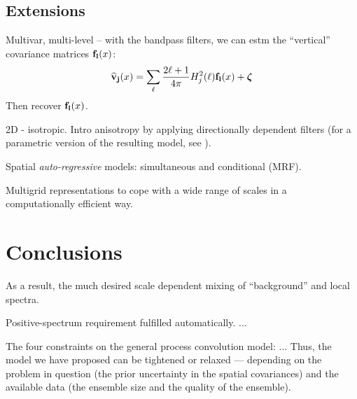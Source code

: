 \documentclass[12pt]{article}
\begin{document}
\subsection{Extensions}
\label{sec_discu_ext}



Multivar, multi-level -- with the bandpass filters, we can estm the ``vertical'' covariance matrices ${\bf f_{l}}(x)$:
%
\begin {equation}
\label{VBj}
{\bf \widehat v_j}(x) =  \sum_\ell \frac{2\ell +1}{4\pi}  H_j^2(\ell) {\bf f_{l}}(x) + \boldsymbol\zeta
\end {equation}
%
Then recover $ {\bf f_{l}}(x)$.


2D - isotropic. Intro anisotropy by applying directionally dependent filters (for a parametric
version of the resulting model, see \citet{Katzfuss}).

Spatial {\em auto-regressive} models: simultaneous and conditional (MRF).

Multigrid representations to cope with a wide range of scales in a computationally
efficient way.







\section{Conclusions}
\label{sec_conclu}





As a result, the much desired scale dependent mixing of ``background'' and local spectra.

Positive-spectrum requirement fulfilled automatically.
...


The four constraints on the general process convolution model: ...
Thus, the model we have proposed can be tightened or relaxed ---
depending on the problem in question (the prior uncertainty in the spatial covariances) and the 
available data (the ensemble size and the quality of the ensemble).
\end{document}
